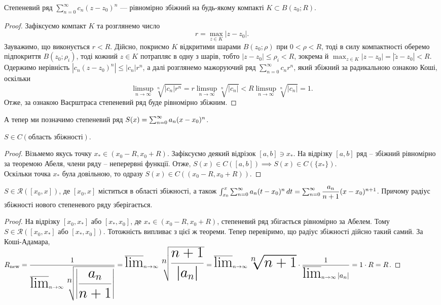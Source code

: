 \documentclass{math_library}
\begin{document}
\begin{theorem}
Степеневий ряд $\displaystyle\sum_{n=0}^\infty c_n(z-z_0)^n$ --- рівномірно збіжний на будь-якому компакті $K \subset B(z_0;R)$.
\end{theorem}

\begin{proof}
Зафіксуємо компакт $K$ та розглянемо число
\[
r = \max_{z \in K} |z-z_0|.
\]
Зауважимо, що виконується $r < R$. Дійсно, покриємо $K$ відкритими шарами $B(z_0;\rho)$ при $0 < \rho < R$, тоді в силу компактності оберемо підпокриття $B(z_0;\rho_i)$, тоді кожний $z \in K$ потрапляє в одну з шарів, тобто $|z-z_0| \leq \rho_i < R$, зокрема й $\displaystyle\max_{z \in K} |z-z_0| = |\tilde{z}-z_0| < R$.\\
Одержимо нерівність $|c_n(z-z_0)^n| \leq |c_n| r^n$, а далі розглянемо мажоруючий ряд $\displaystyle\sum_{n=0}^\infty c_n r^n$, який збіжний за радикальною ознакою Коші, оскільки
\[
\limsup_{n \to \infty} \sqrt[n]{|c_n| r^n} = r \limsup_{n \to \infty} \sqrt[n]{|c_n|} < R \limsup_{n \to \infty} \sqrt[n]{|c_n|} = 1.
\]
Отже, за ознакою Ваєрштраса степеневий ряд буде рівномірно збіжним.
\end{proof}

\iffalse
А тепер ми позначимо степеневий ряд $\huge S(x) = \sum_{n=0}^\infty a_n(x-x_0)^n$.

\begin{theorem}
$S \in C(\text{область збіжності})$.
\end{theorem}

\begin{proof}
Візьмемо якусь точку $x_* \in (x_0-R,x_0+R)$. Зафіксуємо деякий відрізок $[a,b] \ni x_*$. На відрізку $[a,b]$ ряд -- збіжний рівномірно за теоремою Абеля, члени ряду -- неперервні функції. Отже, $S(x) \in C([a,b]) \implies S(x) \in C(\{x_*\})$.\\
Оскільки точка $x_*$ була довільною, то одразу $S(x) \in C((x_0-R, x_0+R))$.
\end{proof}

\begin{theorem}
$S \in \mathcal{R}([x_0,x])$, де $[x_0,x]$ міститься в області збіжності, а також $\huge\int_{x_0}^x \huge\sum_{n=0}^\infty a_n (t-x_0)^n\,dt = \sum_{n=0}^\infty \dfrac{a_n}{n+1}(x-x_0)^{n+1}$. Причому радіус збіжності нового степеневого ряду зберігається.
\end{theorem}

\begin{proof}
На відрізку $[x_0,x_*]$ або $[x_*,x_0]$, де $x_* \in (x_0-R,x_0+R)$, степеневий ряд збігається рівномірно за Абелем. Тому $S \in \mathcal{R}([x_0,x_*] \text{ або } [x_*,x_0])$. Тотожність випливає з цієї ж теореми. Тепер перевіримо, що радіус збіжності дійсно такий самий. За Коші-Адамара,\\
$R_{\text{new}} = \huge \dfrac{1}{\huge\varlimsup_{n \to \infty} \sqrt[n]{\abs{\dfrac{a_n}{n+1}}} } = \varlimsup_{n \to \infty} \sqrt[n]{\dfrac{n+1}{|a_n|}} = \varlimsup_{n \to \infty} \sqrt[n]{n+1} \cdot \dfrac{1}{\huge\varlimsup_{n \to \infty} |a_n|} = 1 \cdot R = R$.
\end{proof}
\end{document}
